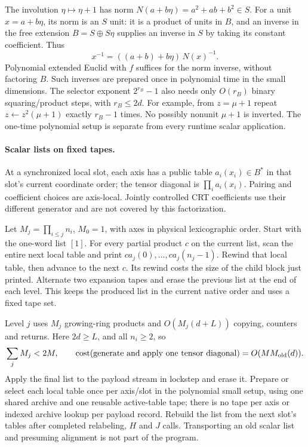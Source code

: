 The involution $\eta\mapsto\eta+1$ has norm
$N(a+b\eta)=a^2+ab+b^2\in S$. For a unit $x=a+b\eta$, its norm is
an $S$ unit: it is a product of units in $B$, and an inverse in
the free extension $B=S\oplus S\eta$ supplies an inverse in $S$
by taking its constant coefficient. Thus
\[
 x^{-1}=((a+b)+b\eta)\,N(x)^{-1}.
\]
Polynomial extended Euclid with $f$ suffices for the norm inverse,
without factoring $B$. Such inverses are prepared once in polynomial
time in the small dimensions. The selector exponent $2^{r_B}-1$
also needs only $O(r_B)$ binary squaring/product steps, with $r_B\le2d$.
For example,
from $z=\mu+1$ repeat $z\gets z^2(\mu+1)$ exactly $r_B-1$ times.
No possibly nonunit $\mu+1$ is inverted. The one-time polynomial
setup is separate from every runtime scalar application.

\paragraph{Scalar lists on fixed tapes.}
At a synchronized local slot, each axis has a public table
$a_i(x_i)\in B^*$ in that slot's current coordinate order; the
tensor diagonal is $\prod_i a_i(x_i)$. Pairing and coefficient
choices are axis-local. Jointly controlled CRT coefficients use
their different generator and are not covered by this factorization.

Let $M_j=\prod_{i\le j}n_i$, $M_0=1$, with axes in physical
lexicographic order. Start with the one-word list $[1]$.
For every partial product $c$ on the current list, scan the entire
next local table and print
$ca_j(0),\ldots,ca_j(n_j-1)$. Rewind that local table, then advance
to the next $c$. Its rewind costs the size of the child block just
printed. Alternate two expansion tapes and erase the previous list
at the end of each level. This keeps the produced list in the
current native order and uses a fixed tape set.

Level $j$ uses $M_j$ growing-ring products and
$O(M_j(d+L))$ copying, counters and returns. Here $2d\ge L$, and
all $n_i\ge2$, so
\[
 \sum_j M_j<2M,\qquad
 \operatorname{cost}(\hbox{generate and apply one tensor diagonal})
       =O(MM_{\rm old}(d)).
\]
Apply the final list to the payload stream in lockstep and erase it.
Prepare or select each local table once per axis/slot in the
polynomial small setup, using one shared archive and one reusable
active-table tape; there is no tape per axis or indexed archive lookup per
payload record. Rebuild the list from the next slot's tables after
completed relabeling, $H$ and $J$ calls. Transporting an old scalar
list and presuming alignment is not part of the program.
